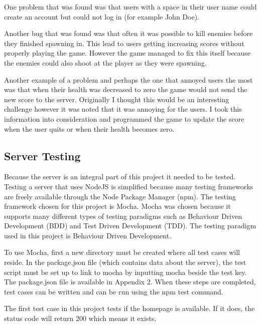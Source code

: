 \documentclass[12pt]{article}
\begin{document}
One problem that was found was that users with a space in their user name could create an account but could not log in (for example John Doe).

Another bug that was found was that often it was possible to kill enemies before they finished spawning in. This lead to users getting increasing scores without properly playing the game. However the game managed to fix this itself because the enemies could also shoot at the player as they were spawning. 

Another example of a problem and perhaps the one that annoyed users the most was that when their health was decreased to zero the game would not send the new score to the server. Originally I thought this would be an interesting challenge however it was noted that it was annoying for the users. I took this information into consideration and programmed the game to update the score when the user quits or when their health becomes zero.

\subsection{Server Testing}
Because the server is an integral part of this project it needed to be tested. Testing a server that uses NodeJS is simplified because many testing frameworks are freely available through the Node Package Manager (npm). The testing framework chosen for this project is Mocha. Mocha was chosen because it supports many different types of testing paradigms such as Behaviour Driven Development (BDD) and Test Driven Development (TDD). The testing paradigm used in this project is Behaviour Driven Development. 

To use Mocha, first a new directory must be created where all test cases will reside. In the package.json file (which contains data about the server), the test script must be set up to link to mocha by inputting mocha beside the test key. The package.json file is available in Appendix 2. When these steps are completed, test cases can be written and can be run using the npm test command. 


The first test case in this project tests if the homepage is available. If it does, the status code will return 200 which means it exists. 
\end{document}
